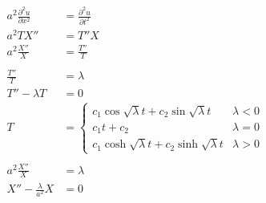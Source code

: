 \documentclass{article}
\begin{document}
\begin{align*}
  a^2 \frac{\partial^2 u}{\partial x^2} & = \frac{\partial^2 u}{\partial t^2}                                                                                                                                     \\
  a^2 T X''                             & = T'' X                                                                                                                                                                 \\
  a^2 \frac{X''}{X}                     & = \frac{T''}{T}                                                                                                                                                         \\ \\
  \frac{T''}{T}                         & = \lambda                                                                                                                                                               \\
  T'' - \lambda T                       & = 0                                                                                                                                                                     \\
  T                                     & = \begin{cases}
                                              c_1 \cos \sqrt{\lambda} t + c_2 \sin \sqrt{\lambda} t   & \lambda < 0 \\
                                              c_1 t + c_2                                             & \lambda = 0 \\
                                              c_1 \cosh \sqrt{\lambda} t + c_2 \sinh \sqrt{\lambda} t & \lambda > 0
                                            \end{cases}                                                                                                 \\ \\
  a^2 \frac{X''}{X}                     & = \lambda                                                                                                                                                               \\
  X'' - \frac{\lambda}{a^2} X           & = 0                                                                                                                                                                     \\

\end{align*}
\end{document}
